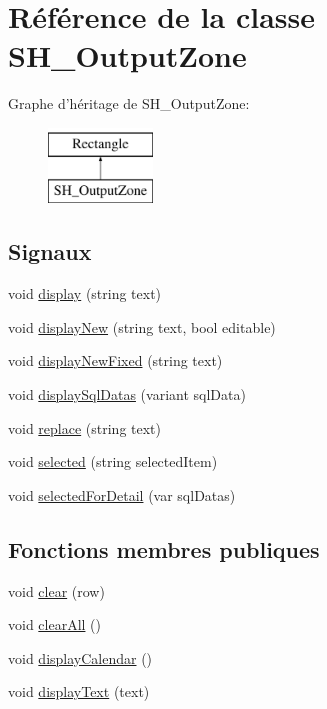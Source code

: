 \hypertarget{classSH__OutputZone}{\section{Référence de la classe S\-H\-\_\-\-Output\-Zone}
\label{classSH__OutputZone}
}
Graphe d'héritage de S\-H\-\_\-\-Output\-Zone\-:\begin{figure}[H]
\begin{center}
\leavevmode
\includegraphics[height=2.000000cm]{classSH__OutputZone}
\end{center}
\end{figure}
\subsection*{Signaux}
\begin{DoxyCompactItemize}
\item 
void \hyperlink{classSH__OutputZone_a137f08121743a873a4b803378564b831}{display} (string text)
\item 
void \hyperlink{classSH__OutputZone_ae5a2247f1c3223e5a73de52fdbdb821b}{display\-New} (string text, bool editable)
\item 
void \hyperlink{classSH__OutputZone_a899a18d02081f15ec88699652926d1b2}{display\-New\-Fixed} (string text)
\item 
void \hyperlink{classSH__OutputZone_ad3182752fc9999b2f907af5d07e2575d}{display\-Sql\-Datas} (variant sql\-Data)
\item 
void \hyperlink{classSH__OutputZone_af5abdd0bd587e4df3ed9278192978da5}{replace} (string text)
\item 
void \hyperlink{classSH__OutputZone_a41c89f3ac170cc1fa3f2946c155da958}{selected} (string selected\-Item)
\item 
void \hyperlink{classSH__OutputZone_a5906ca386b615db53fa8dca07c8f9f89}{selected\-For\-Detail} (var sql\-Datas)
\end{DoxyCompactItemize}
\subsection*{Fonctions membres publiques}
\begin{DoxyCompactItemize}
\item 
void \hyperlink{classSH__OutputZone_a5e060d86ebcea9f4dd4acfd203d324de}{clear} (row)
\item 
void \hyperlink{classSH__OutputZone_a90e3b3d2bdd58bef244d5a347ddcf74a}{clear\-All} ()
\item 
void \hyperlink{classSH__OutputZone_a3fb363c9732edb963b97a0af893378a7}{display\-Calendar} ()
\item 
void \hyperlink{classSH__OutputZone_a2643d4fe88a476c2296f9e7a44da6c62}{display\-Text} (text)
\end{DoxyCompactItemize}
